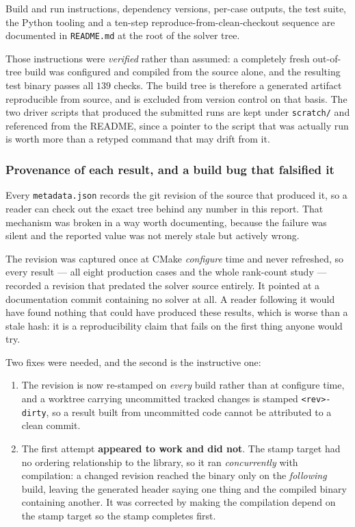 Build and run instructions, dependency versions, per-case outputs, the test suite,
the Python tooling and a ten-step reproduce-from-clean-checkout sequence are
documented in \texttt{README.md} at the root of the solver tree.

Those instructions were \emph{verified} rather than assumed: a completely fresh
out-of-tree build was configured and compiled from the source alone, and the resulting
test binary passes all $139$ checks. The build tree is therefore a generated artifact
reproducible from source, and is excluded from version control on that basis. The two
driver scripts that produced the submitted runs are kept under \texttt{scratch/} and
referenced from the README, since a pointer to the script that was actually run is worth
more than a retyped command that may drift from it.

\subsubsection{Provenance of each result, and a build bug that falsified it}
\label{sec:provenancestamp}

Every \texttt{metadata.json} records the git revision of the source that produced it, so a
reader can check out the exact tree behind any number in this report. That mechanism was
broken in a way worth documenting, because the failure was silent and the reported value
was not merely stale but actively wrong.

The revision was captured once at CMake \emph{configure} time and never refreshed, so every
result --- all eight production cases and the whole rank-count study --- recorded a revision
that predated the solver source entirely. It pointed at a documentation commit containing no
solver at all. A reader following it would have found nothing that could have produced these
results, which is worse than a stale hash: it is a reproducibility claim that fails on the
first thing anyone would try.

Two fixes were needed, and the second is the instructive one:
\begin{enumerate}
  \item The revision is now re-stamped on \emph{every} build rather than at configure time,
  and a worktree carrying uncommitted tracked changes is stamped \texttt{<rev>-dirty}, so a
  result built from uncommitted code cannot be attributed to a clean commit.
  \item The first attempt \textbf{appeared to work and did not}. The stamp target had no
  ordering relationship to the library, so it ran \emph{concurrently} with compilation: a
  changed revision reached the binary only on the \emph{following} build, leaving the
  generated header saying one thing and the compiled binary containing another. It was
  corrected by making the compilation depend on the stamp target so the stamp completes
  first.
\end{enumerate}

